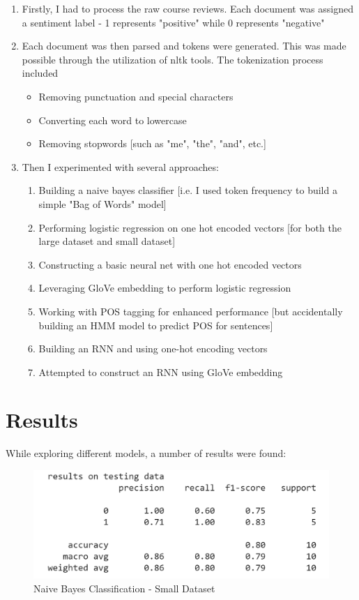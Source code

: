 \documentclass[11pt,a4paper]{article}
\begin{document}
\begin{enumerate}
    \item Firstly, I had to process the raw course reviews. Each document was assigned a sentiment label - 1 represents "positive" while 0 represents "negative"
    \item Each document was then parsed and tokens were generated. This was made possible through the utilization of nltk tools. The tokenization process included
    \begin{itemize}
        \item Removing punctuation and special characters
        \item Converting each word to lowercase
        \item Removing stopwords [such as "me", "the", "and", etc.] 
    \end{itemize}
    \item Then I experimented with several approaches:
    \begin{enumerate}
        \item Building a naive bayes classifier [i.e. I used token frequency to build a simple "Bag of Words" model]
        \item Performing logistic regression on one hot encoded vectors [for both the large dataset and small dataset]
        \item Constructing a basic neural net with one hot encoded vectors
        \item Leveraging GloVe embedding to perform logistic regression
        \item Working with POS tagging for enhanced performance [but accidentally building an HMM model to predict POS for sentences]
        \item Building an RNN and using one-hot encoding vectors
        \item Attempted to construct an RNN using GloVe embedding
    \end{enumerate}
    
\end{enumerate}





\section{Results}

While exploring different models, a number of results were found:

\begin{figure}[h]
    \centering
    \includegraphics[width=1\linewidth]{NB_result.png}
    \caption{Naive Bayes Classification - Small Dataset}
\end{figure}
\end{document}
